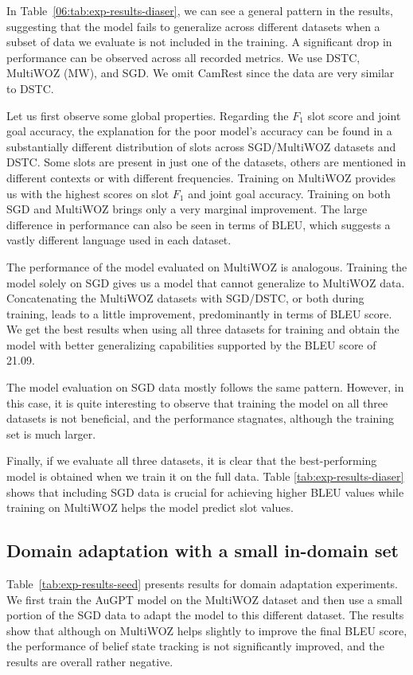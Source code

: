 In Table~\ref{06:tab:exp-results-diaser}, we can see a general pattern in the results, suggesting that the model fails to generalize across different datasets when a subset of data we evaluate is not included in the training. A significant drop in performance can be observed across all recorded metrics.
We use  DSTC, MultiWOZ (MW), and SGD. We omit CamRest since the data are very similar to DSTC.

Let us first observe some global properties.
Regarding the $F_1$ slot score and joint goal accuracy, the explanation for the poor model's accuracy can be found in a substantially different distribution of slots across SGD/MultiWOZ datasets and DSTC.
Some slots are present in just one of the datasets, others are mentioned in different contexts or with different frequencies.
Training on MultiWOZ provides us with the highest scores on slot $F_1$ and joint goal accuracy.
Training on both SGD and MultiWOZ brings only a very marginal improvement.
The large difference in performance can also be seen in terms of BLEU, which suggests a vastly different language used in each dataset.

The performance of the model evaluated on MultiWOZ is analogous.
Training the model solely on SGD gives us a model that cannot generalize to MultiWOZ data.
Concatenating the MultiWOZ datasets with SGD/DSTC, or both during training, leads to a little improvement, predominantly in terms of BLEU score.
We get the best results when using all three datasets for training and obtain the model with better generalizing capabilities supported by the BLEU score of 21.09.

The model evaluation on SGD data mostly follows the same pattern. However, in this case, it is quite interesting to observe that training the model on all three datasets is not beneficial, and the performance stagnates, although the training set is much larger.

Finally, if we evaluate all three datasets, it is clear that the best-performing model is obtained when we train it on the full data.
Table \ref{tab:exp-results-diaser} shows that including SGD data is crucial for achieving higher BLEU values while training on MultiWOZ helps the model predict slot values.

\subsection{Domain adaptation with a small in-domain set}
Table~\ref{tab:exp-results-seed} presents results for domain adaptation experiments.
We first train the AuGPT model on the MultiWOZ dataset and then use a small portion of the SGD data to adapt the model to this different dataset.
The results show that although on MultiWOZ helps slightly to improve the final BLEU score, the performance of belief state tracking is not significantly improved, and the results are overall rather negative.


